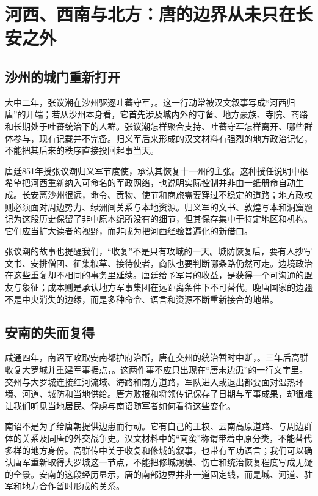 \section{河西、西南与北方：唐的边界从未只在长安之外}

\subsection{沙州的城门重新打开}
大中二年，张议潮在沙州驱逐吐蕃守军，。这一行动常被汉文叙事写成“河西归唐”的开端；若从沙州本身看，它首先涉及城内外的守备、地方豪族、寺院、商路和长期处于吐蕃统治下的人群。张议潮怎样聚合支持、吐蕃守军怎样离开、哪些群体参与，现有记载并不完备。归义军后来形成的汉文材料有强烈的地方政治记忆，不能把其后来的秩序直接投回起事当天。

唐廷851年授张议潮归义军节度使，承认其恢复十一州的主张。这种授任说明中枢希望把河西重新纳入可命名的军政网络，也说明实际控制并非由一纸册命自动生成。长安离沙州很远，命令、贡物、使节和商旅需要穿过不稳定的道路；地方政权则必须面对周边势力、绿洲间关系与本地资源。归义军的文书、敦煌写本和洞窟题记为这段历史保留了非中原本纪所没有的细节，但其保存集中于特定地区和机构。它们应当扩大读者的视野，而非成为把河西经验普遍化的新借口。

张议潮的故事也提醒我们，“收复”不是只有攻城的一天。城防恢复后，要有人抄写文书、安排僧团、征集粮草、接待使者，商队也要判断哪条路仍然可走。边境政治在这些重复却不相同的事务里延续。唐廷给予军号的收益，是获得一个可沟通的盟友与象征；成本则是承认地方军事集团在远距离条件下不可替代。晚唐国家的边疆不是中央消失的边缘，而是多种命令、语言和资源不断重新接合的地带。

\subsection{安南的失而复得}
咸通四年，南诏军攻取安南都护府治所，唐在交州的统治暂时中断，。三年后高骈收复大罗城并重建军事据点，。这两件事不应只出现在“唐末边患”的一行文字里。交州与大罗城连接红河流域、海路和南方道路，军队进入或退出都要面对湿热环境、河道、城防和当地供给。唐方败报和将领传记保存了日期与军事成果，却很难让我们听见当地居民、俘虏与南诏随军者如何看待这些变化。

南诏不是为了给唐朝提供边患而行动。它有自己的王权、云南高原道路、与周边群体的关系及同唐的外交战争史。汉文材料中的“南蛮”称谓带着中原分类，不能替代多样的地方身份。高骈传中关于收复和修城的叙事，也带有军功语言；我们可以确认唐军重新取得大罗城这一节点，不能把修城规模、伤亡和统治恢复程度写成无疑的全景。安南的这段经历显示，唐的南部边界并非一道固定线，而是城、河道、驻军和地方合作暂时形成的关系。

